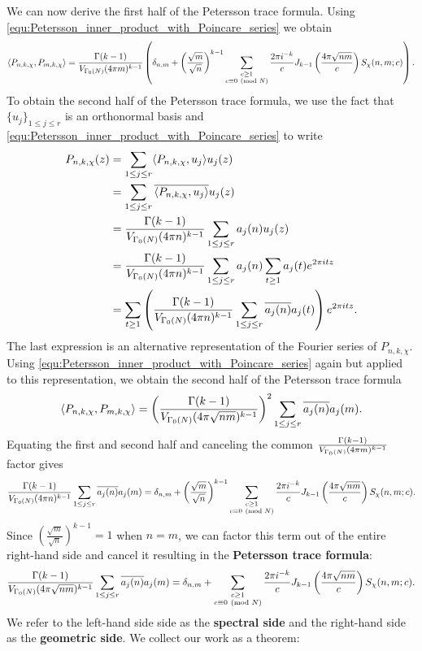     We can now derive the first half of the Petersson trace formula. Using \cref{equ:Petersson_inner_product_with_Poincare_series} we obtain
    \[
      \langle P_{n,k,\chi},P_{m,k,\chi}\rangle = \frac{\Gamma(k-1)}{V_{\Gamma_{0}(N)}(4\pi m)^{k-1}}\left(\delta_{n,m}+\left(\frac{\sqrt{m}}{\sqrt{n}}\right)^{k-1}\sum_{\substack{c \ge 1 \\ c \equiv 0 \ \left(\text{mod }N\right)}}\frac{2\pi i^{-k}}{c}J_{k-1}\left(\frac{4\pi\sqrt{nm}}{c}\right)S_{\chi}(n,m;c)\right).
    \]
    To obtain the second half of the Petersson trace formula, we use the fact that $\{u_{j}\}_{1 \le j \le r}$ is an orthonormal basis and \cref{equ:Petersson_inner_product_with_Poincare_series} to write
    \begin{align*}
      P_{n,k,\chi}(z) &= \sum_{1 \le j \le r}\langle P_{n,k,\chi},u_{j}\rangle u_{j}(z) \\
      &= \sum_{1 \le j \le r}\overline{\langle P_{n,k,\chi},u_{j}\rangle}u_{j}(z) \\
      &= \frac{\Gamma(k-1)}{V_{\Gamma_{0}(N)}(4\pi n)^{k-1}}\sum_{1 \le j \le r}a_{j}(n)u_{j}(z) \\
      &= \frac{\Gamma(k-1)}{V_{\Gamma_{0}(N)}(4\pi n)^{k-1}}\sum_{1 \le j \le r}a_{j}(n)\sum_{t \ge 1}a_{j}(t)e^{2\pi itz} \\
      &= \sum_{t \ge 1}\left(\frac{\Gamma(k-1)}{V_{\Gamma_{0}(N)}(4\pi n)^{k-1}}\sum_{1 \le j \le r}\overline{a_{j}(n)}a_{j}(t)\right)e^{2\pi itz}.
    \end{align*}
    The last expression is an alternative representation of the Fourier series of $P_{n,k,\chi}$. Using \cref{equ:Petersson_inner_product_with_Poincare_series} again but applied to this representation, we obtain the second half of the Petersson trace formula
    \[
      \langle P_{n,k,\chi},P_{m,k,\chi}\rangle = \left(\frac{\Gamma(k-1)}{V_{\Gamma_{0}(N)}(4\pi \sqrt{nm})^{k-1}}\right)^{2}\sum_{1 \le j \le r}\overline{a_{j}(n)}a_{j}(m).
    \]
    Equating the first and second half and canceling the common $\frac{\Gamma(k-1)}{V_{\Gamma_{0}(N)}(4\pi m)^{k-1}}$ factor gives
    \[
      \frac{\Gamma(k-1)}{V_{\Gamma_{0}(N)}(4\pi n)^{k-1}}\sum_{1 \le j \le r}\overline{a_{j}(n)}a_{j}(m) = \delta_{n,m}+\left(\frac{\sqrt{m}}{\sqrt{n}}\right)^{k-1}\sum_{\substack{c \ge 1 \\ c \equiv 0 \ \left(\text{mod }N\right)}}\frac{2\pi i^{-k}}{c}J_{k-1}\left(\frac{4\pi\sqrt{nm}}{c}\right)S_{\chi}(n,m;c).
    \]
    Since $\left(\frac{\sqrt{m}}{\sqrt{n}}\right)^{k-1} = 1$ when $n = m$, we can factor this term out of the entire right-hand side and cancel it resulting in the \textbf{Petersson trace formula}:
    \[
      \frac{\Gamma(k-1)}{V_{\Gamma_{0}(N)}(4\pi\sqrt{nm})^{k-1}}\sum_{1 \le j \le r}\overline{a_{j}(n)}a_{j}(m) = \delta_{n,m}+\sum_{\substack{c \ge 1 \\ c \equiv 0 \ \left(\text{mod }N\right)}}\frac{2\pi i^{-k}}{c}J_{k-1}\left(\frac{4\pi\sqrt{nm}}{c}\right)S_{\chi}(n,m;c).
    \]
    We refer to the left-hand side side as the \textbf{spectral side} and the right-hand side as the \textbf{geometric side}. We collect our work as a theorem:

